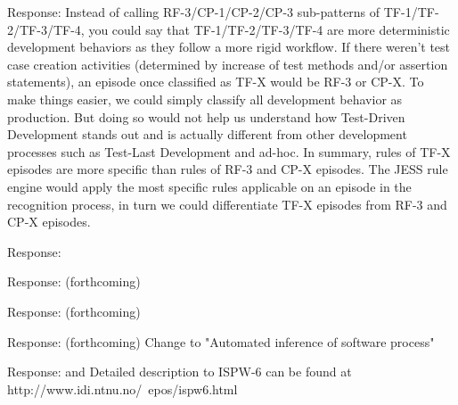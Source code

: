 \documentclass[11pt]{article}
\begin{document}
\noindent Response: Instead of calling RF-3/CP-1/CP-2/CP-3 sub-patterns of
TF-1/TF-2/TF-3/TF-4, you could say that TF-1/TF-2/TF-3/TF-4 are more  deterministic development behaviors as they follow a more rigid workflow.
If there weren't test case creation activities (determined by increase of test methods and/or assertion statements), an episode once classified as TF-X would be RF-3 or CP-X. To make things easier, we could simply classify all development
behavior as production. But doing so would not help us understand how Test-Driven Development stands out and is actually different from other development processes such as Test-Last Development and ad-hoc. In summary,  rules of TF-X episodes are more specific than rules of RF-3 and CP-X episodes. The JESS rule engine would apply the most specific rules applicable on an episode in the recognition process, in turn we could differentiate TF-X episodes from RF-3 and CP-X episodes.


\noindent Response: \cite{csdl2-07-04}


\noindent Response: (forthcoming)


\noindent Response: (forthcoming)



\noindent Response: (forthcoming) Change to "Automated inference of software process"


\noindent Response: \cite{ispw6} and \cite{Hackystat:06,csdl2-04-11,csdl2-04-22,csdl2-03-12} Detailed description to ISPW-6 can be found at http://www.idi.ntnu.no/~epos/ispw6.html
\end{document}
